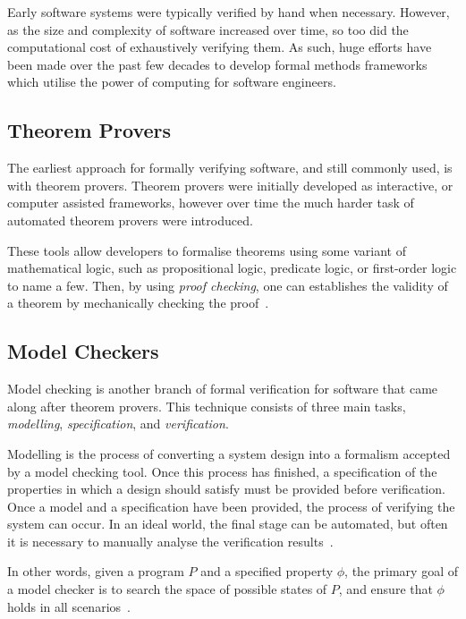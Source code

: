 Early software systems were typically verified by hand when necessary. However, as 
the size and complexity of software increased over time, so too did the computational
cost of exhaustively verifying them. As such, huge efforts have been made over the past few decades
to develop formal methods frameworks which utilise the power of computing for software engineers.

\subsection{Theorem Provers}

The earliest approach for formally verifying software, and still commonly used, is with theorem provers.
Theorem provers were initially developed as interactive, or computer assisted frameworks, however over
time the much harder task of automated theorem provers were introduced.

These tools allow developers to formalise theorems using some variant of mathematical logic,
such as propositional logic, predicate logic, or first-order logic to name a few. Then, by 
using \textit{proof checking}, one can establishes the validity of a theorem by mechanically checking the proof~\citep{geuvers2009}.


\subsection{Model Checkers}

Model checking is another branch of formal verification for software that
came along after theorem provers. This technique consists of three main tasks, \textit{modelling}, \textit{specification}, and \textit{verification}.

Modelling is the process of converting a system design into a formalism accepted by a model checking tool. Once this process has 
finished, a specification of the properties in which a design should satisfy must be provided before verification. Once a model and
a specification have been provided, the process of verifying the system can occur. In an ideal world, the final stage can be automated, but
often it is necessary to manually analyse the verification results~\citep{clarke2018}.

In other words, given a program $P$ and a specified property $\phi$, the primary goal of a model checker
is to search the space of possible states of $P$, and ensure that $\phi$ holds in all scenarios~\citep{zhang2019}.

